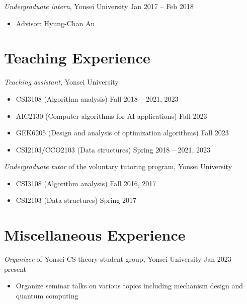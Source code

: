 \documentclass{article}
\newcommand{\killinitspace}{-0.7em}
\begin{document}
\textsl{Undergraduate intern}, Yonsei University \hfill Jan 2017 -- Feb 2018
\vspace{\killinitspace}
\begin{itemize}
\item Advisor: Hyung-Chan An
\end{itemize}

\section{Teaching Experience}
\textsl{Teaching assistant}, Yonsei University
\vspace{\killinitspace}
\begin{itemize}
\item CSI3108 (Algorithm analysis) \hfill Fall 2018 -- 2021, 2023
\item AIC2130 (Computer algorithms for AI applications) \hfill Fall 2023
\item GEK6205 (Design and analysis of optimization algorithms) \hfill Fall 2023
\item CSI2103/CCO2103 (Data structures) \hfill Spring 2018 -- 2021, 2023
\end{itemize}

\textsl{Undergraduate tutor} of the voluntary tutoring program, Yonsei University
\vspace{\killinitspace}
\begin{itemize}
\item CSI3108 (Algorithm analysis) \hfill Fall 2016, 2017
\item CSI2103 (Data structures) \hfill Spring 2017
\end{itemize}


\section{Miscellaneous Experience}
\textsl{Organizer} of Yonsei CS theory student group, Yonsei University \hfill Jan 2023 -- present
\vspace{\killinitspace}
\begin{itemize}
\item Organize seminar talks on various topics including mechanism design and quantum computing
\end{itemize}
\end{document}

